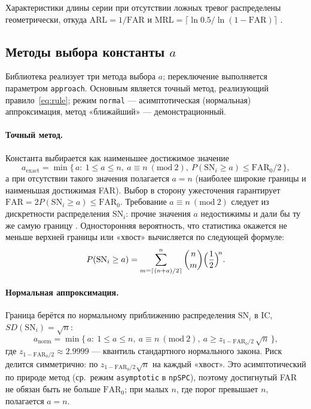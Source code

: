 \documentclass[11pt,a4paper]{article}
\newcommand{\SN}{\mathrm{SN}}
\begin{document}
Характеристики длины серии при отсутствии ложных тревог распределены
геометрически, откуда
$\mathrm{ARL}=1/\mathrm{FAR}$ и
$\mathrm{MRL}=\lceil \ln 0.5 / \ln(1-\mathrm{FAR})\rceil$
\cite{Chakraborti2019}.

\subsection{Методы выбора константы $a$}
\label{subsec:modes}

Библиотека реализует три метода выбора $a$; переключение выполняется
параметром \texttt{approach}. Основным является точный метод,
реализующий правило~\eqref{eq:rule}; режим \texttt{normal} --- асимптотическая
(нормальная) аппроксимация, метод «ближайший» --- демонстрационный.

\paragraph{Точный метод.}
Константа выбирается как наименьшее достижимое значение
\begin{equation}
  a_{\mathrm{exact}}=\min\{\,a:\ 1\le a\le n,\ a\equiv n\ (\mathrm{mod}\ 2),\
  P(\SN_i\ge a)\le \mathrm{FAR}_0/2\,\},
  \label{eq:acons}
\end{equation}
а при отсутствии такого значения полагается $a=n$ (наиболее широкие границы
и наименьшая достижимая FAR). Выбор в сторону ужесточения гарантирует
$\mathrm{FAR}=2P(\SN_i\ge a)\le \mathrm{FAR}_0$. Требование $a\equiv n\
(\mathrm{mod}\ 2)$ следует из дискретности распределения $\SN_i$: прочие
значения $a$ недостижимы и дали бы ту же самую границу
\cite{Amin1995, Gibbons2010}. Односторонняя вероятность, что статистика окажется не меньше верхней границы или «хвост» вычисляется по следующей формуле:
\begin{equation}
  P(\SN_i\ge a)
  =\sum_{m=\lceil (n+a)/2\rceil}^{n}\binom{n}{m}\Bigl(\frac12\Bigr)^{\!n}.
  \label{eq:sntail}
\end{equation}

\paragraph{Нормальная аппроксимация.}
Граница берётся по нормальному приближению распределения $\SN_i$ в IC,
$SD(\SN_i)=\sqrt n$:
\begin{equation}
  a_{\mathrm{norm}}=\min\{\,a:\ 1\le a\le n,\ a\equiv n\ (\mathrm{mod}\ 2),\
  a\ge z_{1-\mathrm{FAR}_0/2}\,\sqrt n\,\},
  \label{eq:asym}
\end{equation}
где $z_{1-\mathrm{FAR}_0/2}\approx2.9999$ --- квантиль стандартного
нормального закона. Риск делится симметрично: по $z_{1-\mathrm{FAR}_0/2}\sqrt n$
на каждый «хвост». Это асимптотический по природе метод (ср.\ режим
\texttt{asymptotic} в \texttt{npSPC}), поэтому достигнутый FAR не обязан
быть не больше $\mathrm{FAR}_0$; при малых $n$, где порог превышает $n$,
полагается $a=n$.
\end{document}
